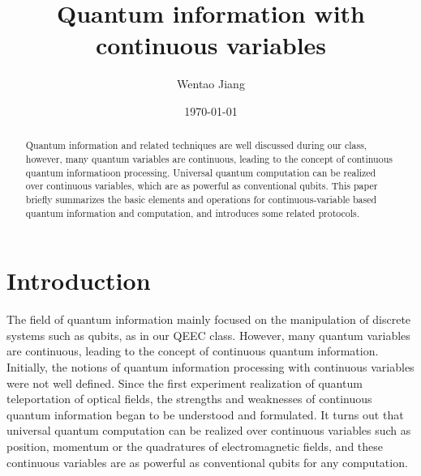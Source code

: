 \documentclass[%
 reprint,
groupedaddress,
showpacs,
 amsmath,amssymb,
 aps,
prb,
]{revtex4-1}
\begin{document}

\title{Quantum information with continuous variables}%

\author{Wentao Jiang}%


\date{\today}

\begin{abstract}
Quantum information and related techniques are well discussed during our class, however, many quantum variables are continuous, leading to the concept of continuous quantum informatioon processing. Universal quantum computation can be realized over continuous variables, which are as powerful as conventional qubits. This paper briefly summarizes the basic elements and operations for continuous-variable based quantum information and computation, and introduces some related protocols.
\end{abstract}
\maketitle


\section{Introduction} %
\label{sec:introduction}
	The field of quantum information mainly focused on the manipulation of discrete systems such as qubits, as in our QEEC class. However, many quantum variables are continuous, leading to the concept of continuous quantum information. Initially, the notions of quantum information processing with continuous variables were not well defined. Since the first experiment realization of quantum teleportation of optical fields, the strengths and weaknesses of continuous quantum information began to be understood and formulated. It turns out that universal quantum computation can be realized over continuous variables such as position, momentum or the quadratures of electromagnetic fields, and these continuous variables are as powerful as conventional qubits for any computation.
\end{document}
